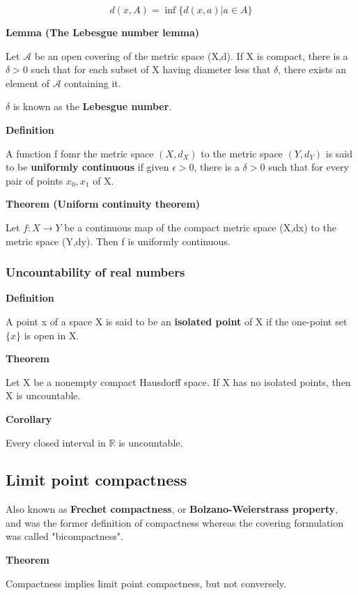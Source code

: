 \documentclass[11pt]{article}
\begin{document}
\[
d(x,A) = \inf \{d(x,a) \vert a \in A\}
\]

\textbf{Lemma (The Lebesgue number lemma)}

Let \(\mathcal{A}\) be an open covering of the metric space (X,d). If X is compact, there is a \(\delta > 0\) such that for each subset of X having diameter less that \(\delta\), there exists an element of \(\mathcal{A}\) containing it.

\(\delta\) is known as the \textbf{Lebesgue number}.

\textbf{Definition}

A function f fomr the metric space \((X,d_X)\) to the metric space \((Y,d_Y)\) is said to be \textbf{uniformly continuous} if given \(\epsilon > 0\), there is a \(\delta > 0\) such that for every pair of points \(x_0,x_1\) of X.

\textbf{Theorem (Uniform continuity theorem)}

Let \(f : X \to Y\) be a continuous map of the compact metric space (X,dx) to the metric space (Y,dy). Then f is uniformly continuous.


\subsubsection{Uncountability of real numbers}
\label{sec:org98b9eff}

\textbf{Definition}

A point x of a space X is said to be an \textbf{isolated point} of X if the one-point set \(\{x\}\) is open in X.

\textbf{Theorem}

Let X be a nonempty compact Hausdorff space. If X has no isolated points, then X is uncountable.

\textbf{Corollary}

Every closed interval in \(\mathbb{R}\) is uncountable.



\subsection{Limit point compactness}
\label{sec:org8e979fc}

Also known as \textbf{Frechet compactness}, or \textbf{Bolzano-Weierstrass property}, and was the former definition of compactness whereas the covering formulation was called "bicompactness".

\textbf{Theorem}

Compactness implies limit point compactness, but not conversely.
\end{document}
